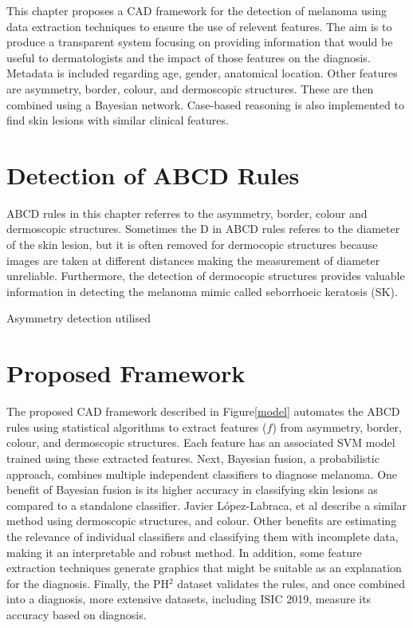 This chapter proposes a CAD framework for the detection of melanoma using data extraction techniques to ensure the use of relevent features. The aim is to produce a transparent system focusing on providing information that would be useful to dermatologists and the impact of those features on the diagnosis. Metadata is included regarding age, gender, anatomical location. Other features are asymmetry, border, colour, and dermoscopic structures. These are then combined using a Bayesian network. Case-based reasoning is also implemented to find skin lesions with similar clinical features.

\section{Detection of ABCD Rules}
ABCD rules in this chapter referres to the asymmetry, border, colour and dermoscopic structures. Sometimes the D in ABCD rules referes to the diameter of the skin lesion, but it is often removed for dermocopic structures because images are taken at different distances making the measurement of diameter unreliable. Furthermore, the detection of dermocopic structures provides valuable information in detecting the melanoma mimic called seborrhoeic keratosis (SK)\cite{Minagawa2017}. 

Asymmetry detection utilised 


\section{Proposed Framework}
The proposed CAD framework described in Figure\ref{model} automates the ABCD rules using statistical algorithms to extract features ($f$) from asymmetry, border, colour, and dermoscopic structures. Each feature has an associated SVM model trained using these extracted features. Next, Bayesian fusion, a probabilistic approach, combines multiple independent classifiers to diagnose melanoma. One benefit of Bayesian fusion is its higher accuracy in classifying skin lesions as compared to a standalone classifier\cite{Takruri2017}.  Javier López-Labraca, et al describe a similar method using dermoscopic structures, and colour\cite{Lopez-Labraca2018}. Other benefits are estimating the relevance of individual classifiers and classifying them with incomplete data, making it an interpretable and robust method. In addition, some feature extraction techniques generate graphics that might be suitable as an explanation for the diagnosis. Finally, the PH$^2$ dataset validates the rules, and once combined into a diagnosis, more extensive datasets, including ISIC 2019, measure its accuracy based on diagnosis.

